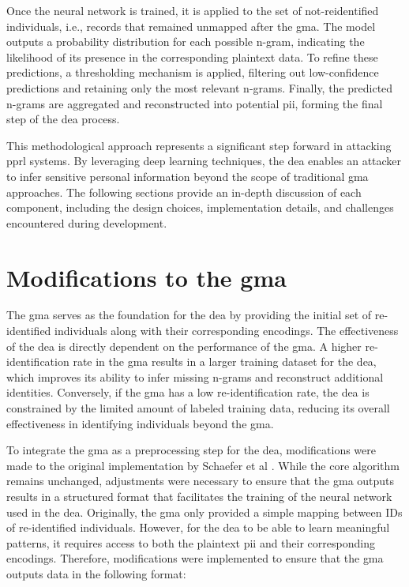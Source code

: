 Once the neural network is trained, it is applied to the set of not-reidentified individuals, i.e., records that remained unmapped after the \ac{gma}.
The model outputs a probability distribution for each possible n-gram, indicating the likelihood of its presence in the corresponding plaintext data.
To refine these predictions, a thresholding mechanism is applied, filtering out low-confidence predictions and retaining only the most relevant n-grams.
Finally, the predicted n-grams are aggregated and reconstructed into potential \ac{pii}, forming the final step of the \ac{dea} process.

This methodological approach represents a significant step forward in attacking \ac{pprl} systems.
By leveraging deep learning techniques, the \ac{dea} enables an attacker to infer sensitive personal information beyond the scope of traditional \ac{gma} approaches.
The following sections provide an in-depth discussion of each component, including the design choices, implementation details, and challenges encountered during development.

\section{Modifications to the \ac{gma}} \label{sec:modifications}

The \ac{gma} serves as the foundation for the \ac{dea} by providing the initial set of re-identified individuals along with their corresponding encodings.
The effectiveness of the \ac{dea} is directly dependent on the performance of the \ac{gma}.
A higher re-identification rate in the \ac{gma} results in a larger training dataset for the \ac{dea}, which improves its ability to infer missing n-grams and reconstruct additional identities.
Conversely, if the \ac{gma} has a low re-identification rate, the \ac{dea} is constrained by the limited amount of labeled training data, reducing its overall effectiveness in identifying individuals beyond the \ac{gma}.

To integrate the \ac{gma} as a preprocessing step for the \ac{dea}, modifications were made to the original implementation by Schaefer et al \cite{schaefer2024}.
While the core algorithm remains unchanged, adjustments were necessary to ensure that the \ac{gma} outputs results in a structured format that facilitates the training of the neural network used in the \ac{dea}.
Originally, the \ac{gma} only provided a simple mapping between IDs of re-identified individuals.
However, for the \ac{dea} to be able to learn meaningful patterns, it requires access to both the plaintext \ac{pii} and their corresponding encodings.
Therefore, modifications were implemented to ensure that the \ac{gma} outputs data in the following format:

